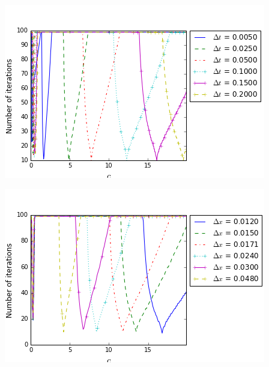 \begingroup
\begin{minipage}{.5\linewidth}
\begin{center}
	\includegraphics[scale=.45]{figures/FinalFigures/NiterxCoefVarDtdx250FinalVersionPMarshal.png}
\end{center}
\end{minipage}
\begin{minipage}{.5\linewidth}
\begin{center}
	\includegraphics[scale=.45]{figures/FinalFigures/NiterxCoefVarDxdt2em2FinalVersionP.png}
\end{center}
\end{minipage}
\endgroup

%

